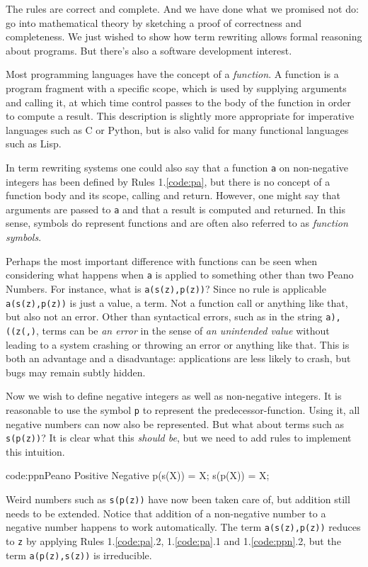 \documentclass[11pt,twoside]{memoir}
\def\E{\emph} %
\def\T{\texttt}
\begin{document}
The rules are correct and complete. And we have done what we promised not do: go into mathematical theory by sketching a proof of correctness and completeness. We just wished to show how term rewriting allows formal reasoning about programs. But there's also a software development interest.

Most programming languages have the concept of a \E{function}. A function is a program fragment with a specific scope, which is used by supplying arguments and calling it, at which time control passes to the body of the function in order to compute a result. This description is slightly more appropriate for imperative languages such as C or Python, but is also valid for many functional languages such as Lisp.

In term rewriting systems one could also say that a function \T{a} on non-negative integers has been defined by Rules 1.\ref{code:pa}, but there is no concept of a function body and its  scope, calling and return. However, one might say that arguments are passed to \T{a} and that a result is computed and returned. In this sense, symbols do represent functions and are often also referred to as \E{function symbols}.

Perhaps the most important difference with functions can be seen when considering what happens when \T{a} is applied to something other than two Peano Numbers. For instance, what is \T{a(s(z),p(z))}? Since no rule is applicable \T{a(s(z),p(z))} is just a value, a term. Not a function call or anything like that, but also not an error. Other than syntactical errors, such as in the string \T{a),((z(,)}, terms can be \E{an error} in the sense of \E{an unintended value} without leading to a system crashing or throwing an error or anything like that. This is both an advantage and a disadvantage: applications are less likely to crash, but bugs may remain subtly hidden.

Now we wish to define negative integers as well as non-negative integers. It is reasonable to use the symbol \T{p} to represent the predecessor-function. Using it, all negative numbers can now also be represented. But what about terms such as \T{s(p(z))}? It is clear what this \E{should be}, but we need to add rules to implement this intuition.

\begin{introcode}{code:ppn}{Peano Positive Negative}
p(s(X)) = X;
s(p(X)) = X;
\end{introcode}

Weird numbers such as \T{s(p(z))} have now been taken care of, but addition still needs to be extended. Notice that addition of a non-negative number to a negative number happens to work automatically. The term \T{a(s(z),p(z))} reduces to \T{z} by applying Rules 1.\ref{code:pa}.2, 1.\ref{code:pa}.1 and 1.\ref{code:ppn}.2, but the term \T{a(p(z),s(z))}
is irreducible.
\end{document}
